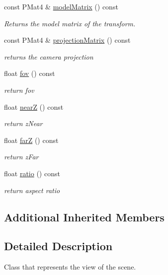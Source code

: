 \begin{DoxyCompactItemize}
const P\+Mat4 \& \mbox{\hyperlink{classprz_1_1_camera_a2fab4f93dddff59ac8cd877f58bd4153}{model\+Matrix}} () const
\begin{DoxyCompactList}\small\item\em Returns the model matrix of the transform. \end{DoxyCompactList}\item 
const P\+Mat4 \& \mbox{\hyperlink{classprz_1_1_camera_aecd84c9c5a0575286dfd429a825822bb}{projection\+Matrix}} () const
\begin{DoxyCompactList}\small\item\em returns the camera projection \end{DoxyCompactList}\item 
float \mbox{\hyperlink{classprz_1_1_camera_a1424858488672135d41e1376c7c0db11}{fov}} () const
\begin{DoxyCompactList}\small\item\em return fov \end{DoxyCompactList}\item 
float \mbox{\hyperlink{classprz_1_1_camera_ac8796588065240fa2e73dccad3f5d858}{nearZ}} () const
\begin{DoxyCompactList}\small\item\em return z\+Near \end{DoxyCompactList}\item 
float \mbox{\hyperlink{classprz_1_1_camera_a6498a63b05939b136657b99d8a8fc9ce}{farZ}} () const
\begin{DoxyCompactList}\small\item\em return z\+Far \end{DoxyCompactList}\item 
float \mbox{\hyperlink{classprz_1_1_camera_a517dfb210de1064c5f13435bff78af6f}{ratio}} () const
\begin{DoxyCompactList}\small\item\em return aspect ratio \end{DoxyCompactList}\end{DoxyCompactItemize}
\subsection*{Additional Inherited Members}


\subsection{Detailed Description}
Class that represents the view of the scene. 



